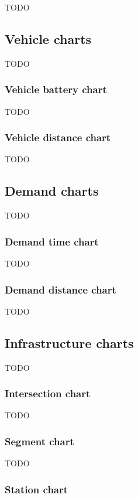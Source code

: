 \documentclass[10pt,twocolumn]{article}
\begin{document}
TODO

\subsection{Vehicle charts}

TODO

\subsubsection{Vehicle battery chart}

TODO

\subsubsection{Vehicle distance chart}

TODO

\subsection{Demand charts}

TODO

\subsubsection{Demand time chart}

TODO

\subsubsection{Demand distance chart}

TODO

\subsection{Infrastructure charts}

TODO

\subsubsection{Intersection chart}

TODO

\subsubsection{Segment chart}

TODO

\subsubsection{Station chart}
\end{document}
